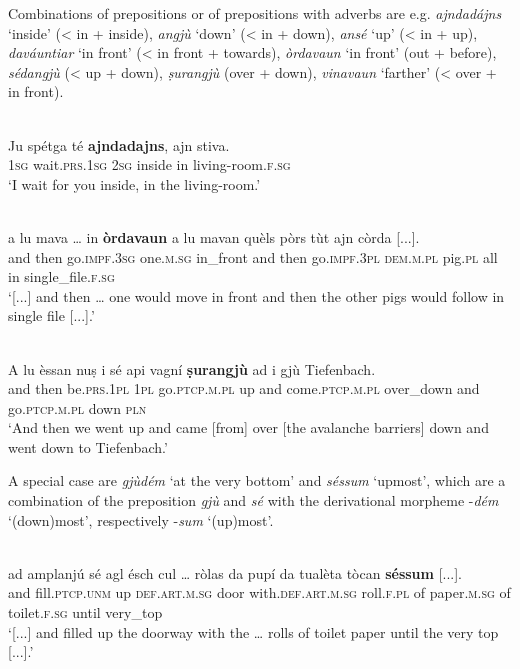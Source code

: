 Combinations of prepositions or of prepositions with adverbs are e.g. \textit{ajndadájns} `inside' (< in + inside), \textit{angjù} `down' (< in + down), \textit{ansé} `up' (< in + up), \textit{daváuntiar} `in front' (< in front + towards), \textit{òrdavaun} `in front' (out + before), \textit{sédangjù} (< up + down), \textit{ṣurangjù} (over + down), \textit{vinavaun} `farther' (< over + in front).

\ea
\label{}
\\
\gll Ju spétga té \textbf{ajndadajns}, ajn stiva.\\
\textsc{1sg} wait\textsc{.prs.1sg} \textsc{2sg} inside in living-room.\textsc{f.sg}\\
\glt `I wait for you inside, in the living-room.'
\z

\ea
\label{}
\\
	\gll    [...] a lu mava … in \textbf{òrdavaun} a lu mavan quèls pòrs tùt ajn còrda [...].\\
{} and then go.\textsc{impf.3sg} {} one.\textsc{m.sg} in\_front and then go.\textsc{impf.3pl} \textsc{dem.m.pl} pig.\textsc{pl} all in single\_file.\textsc{f.sg} \\
\glt `[...] and then … one would move in front and then the other pigs would follow in single file [...].'
\z

\ea
\label{}
\\
\gll A lu èssan nuṣ i sé api vagní \textbf{ṣurangjù} ad i gjù Tiefenbach.\\
and then be.\textsc{prs.1pl} \textsc{1pl} go.\textsc{ptcp.m.pl} up and come.\textsc{ptcp.m.pl} over\_down and go.\textsc{ptcp.m.pl} down \textsc{pln} \\
\glt `And then we went up and came [from] over [the avalanche barriers] down and went down to Tiefenbach.'
\z

A special case are \textit{gjùdém} `at the very bottom' and \textit{séssum} `upmost', which are a combination of the preposition \textit{gjù} and \textit{sé} with the derivational morpheme -\textit{dém} `(down)most', respectively -\textit{sum} `(up)most'.

\ea
\label{}
\\
\gll [...] ad amplanjú sé agl ésch cul … ròlas da pupí da tualèta tòcan \textbf{séssum} [...].\\
{} and fill.\textsc{ptcp.unm} up \textsc{def.art.m.sg} door with.\textsc{def.art.m.sg} {} roll.\textsc{f.pl} of paper.\textsc{m.sg} of toilet.\textsc{f.sg} until very\_top\\
\glt `[...] and filled up the doorway with the … rolls of toilet paper until the very top [...].'
\z

